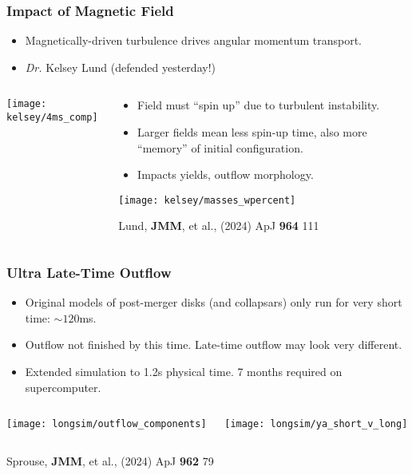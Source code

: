 \documentclass[]{beamer}
\begin{document}
\begin{frame}
  \frametitle{Impact of Magnetic Field}
  \begin{itemize}
  \item Magnetically-driven turbulence drives angular momentum transport.
  \item \textit{Dr.} Kelsey Lund (defended yesterday!)
  \end{itemize}
  \begin{columns}
    \begin{column}{2.5cm}
      \begin{center}
        \texttt{[image: kelsey/4ms\_comp]}
      \end{center}
    \end{column}
    \begin{column}{9.5cm}
      \begin{itemize}
      \item Field must ``spin up'' due to turbulent instability.
      \item Larger fields mean less spin-up time, also more ``memory''
        of initial configuration.
      \item Impacts yields, outflow morphology.
      \end{itemize}
      \begin{center}
        \texttt{[image: kelsey/masses\_wpercent]}
      \end{center}
      {\footnotesize Lund, \textbf{JMM}, et al., (2024) ApJ \textbf{964} 111}
    \end{column}
  \end{columns}
\end{frame}

\begin{frame}
  \frametitle{Ultra Late-Time Outflow}
  \begin{itemize}
  \item Original models of post-merger disks (and collapsars) only run
    for very short time: $\sim 120$ms.
  \item Outflow not finished by this time. Late-time outflow may look
    very different.
  \item Extended simulation to 1.2s physical time. 7 months required
    on supercomputer.
  \end{itemize}
  \begin{columns}
    \begin{column}{6cm}
      \begin{center}
        \texttt{[image: longsim/outflow\_components]}
      \end{center}
    \end{column}
    \begin{column}{6cm}
      \begin{center}
        \texttt{[image: longsim/ya\_short\_v\_long]}
      \end{center}
    \end{column}
  \end{columns}
  {\footnotesize Sprouse, \textbf{JMM}, et al., (2024) ApJ \textbf{962} 79}
\end{frame}
\end{document}

